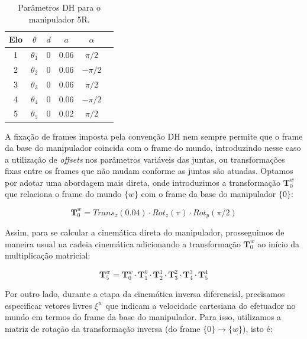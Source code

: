 \begin{table}[htbp]
    \centering
    \begin{tabular}{c c c c c c}
        \toprule
        \textbf{Elo} & \(\theta\)   & \(d\) & \(a\) & \(\alpha\)   \\
        \midrule
        1            & \(\theta_1\) & 0     & 0.06  & \(\pi / 2\)  \\
        2            & \(\theta_2\) & 0     & 0.06  & \(-\pi / 2\) \\
        3            & \(\theta_3\) & 0     & 0.06  & \(\pi / 2\)  \\
        4            & \(\theta_4\) & 0     & 0.06  & \(-\pi / 2\) \\
        5            & \(\theta_5\) & 0     & 0.02  & \(\pi / 2\)  \\
        \bottomrule
    \end{tabular}
    \caption{Parâmetros DH para o manipulador 5R.}\label{tab:dh-parameters-5r}
\end{table}

A fixação de frames imposta pela convenção DH nem sempre permite que o frame da
base do manipulador coincida com o frame do mundo, introduzindo nesse caso a
utilização de \emph{offsets} nos parâmetros variáveis das juntas, ou
transformações fixas entre os frames que não mudam conforme as juntas são
atuadas. Optamos por adotar uma abordagem mais direta, onde introduzimos a
transformação \(\mathbf{T}^{w}_0\) que relaciona o frame do mundo \(\{w\}\) com
o frame da base do manipulador \(\{0\}\):

\begin{equation}
    \mathbf{T}^{w}_0 = Trans_z(0.04) \cdot Rot_z(\pi) \cdot Rot_y(\pi / 2)
\end{equation}

Assim, para se calcular a cinemática direta do manipulador, prosseguimos de
maneira usual na cadeia cinemática adicionando a transformação
\(\mathbf{T}^{w}_0\) ao início da multiplicação matricial:

\begin{equation}
    \mathbf{T}^{w}_5 = \mathbf{T}^{w}_0 \cdot \mathbf{T}^{0}_1 \cdot \mathbf{T}^{1}_2 \cdot \mathbf{T}^{2}_3 \cdot \mathbf{T}^{3}_4 \cdot \mathbf{T}^{4}_5
\end{equation}

Por outro lado, durante a etapa da cinemática inversa diferencial, precisamos
especificar vetores livres \(\xi^w\) que indicam a velocidade cartesiana do
efetuador no mundo em termos do frame da base do manipulador. Para isso,
utilizamos a matriz de rotação da transformação inversa (do frame \(\{0\} \to
\{w\}\)), isto é:

